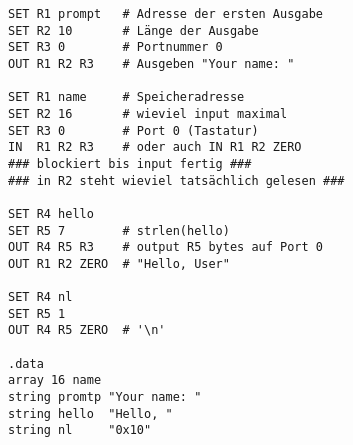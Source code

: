 \begin{lstlisting}
SET R1 prompt   # Adresse der ersten Ausgabe
SET R2 10       # Länge der Ausgabe
SET R3 0        # Portnummer 0
OUT R1 R2 R3    # Ausgeben "Your name: "

SET R1 name     # Speicheradresse
SET R2 16       # wieviel input maximal
SET R3 0        # Port 0 (Tastatur)
IN  R1 R2 R3    # oder auch IN R1 R2 ZERO
### blockiert bis input fertig ###
### in R2 steht wieviel tatsächlich gelesen ###

SET R4 hello
SET R5 7        # strlen(hello)
OUT R4 R5 R3    # output R5 bytes auf Port 0
OUT R1 R2 ZERO  # "Hello, User"

SET R4 nl
SET R5 1
OUT R4 R5 ZERO  # '\n'

.data
array 16 name
string promtp "Your name: "
string hello  "Hello, "
string nl     "0x10"
\end{lstlisting}

